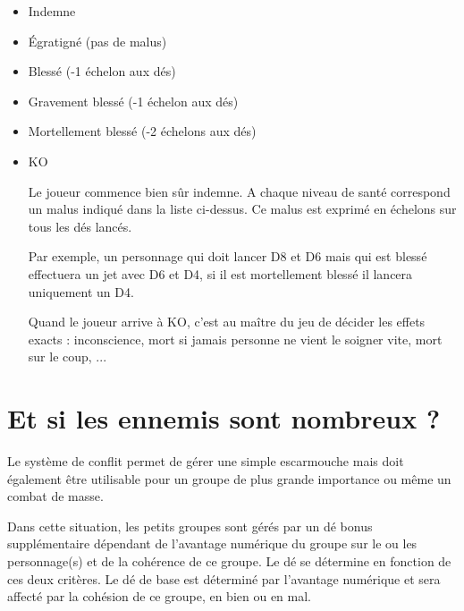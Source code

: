 \documentclass{conf/FusinaClass}
\begin{document}
\begin{itemize}
\item Indemne
\item Égratigné (pas de malus)
\item Blessé (-1 échelon aux dés)
\item Gravement blessé (-1 échelon aux dés)
\item Mortellement blessé (-2 échelons aux dés)
\item KO

Le joueur commence bien sûr indemne. A chaque niveau de santé correspond un malus indiqué dans la liste ci-dessus. Ce malus est exprimé en échelons sur tous les dés lancés.

Par exemple, un personnage qui doit lancer D8 et D6 mais qui est blessé effectuera un jet avec D6 et D4, si il est mortellement blessé il lancera uniquement un D4.

Quand le joueur arrive à KO, c'est au maître du jeu de décider les effets exacts : inconscience, mort si jamais personne ne vient le soigner vite, mort sur le coup, ...

\end{itemize}

\chapter{Et si les ennemis sont nombreux ?}
Le système de conflit permet de gérer une simple escarmouche mais doit également être utilisable pour un groupe de plus grande importance ou même un combat de masse.

Dans cette situation, les petits groupes sont gérés par un dé bonus supplémentaire dépendant de l'avantage numérique du groupe sur le ou les personnage(s) et de la cohérence de ce groupe. Le dé se détermine en fonction de ces deux critères. Le dé de base est déterminé par l'avantage numérique et sera affecté par la cohésion de ce groupe, en bien ou en mal.
\end{document}
